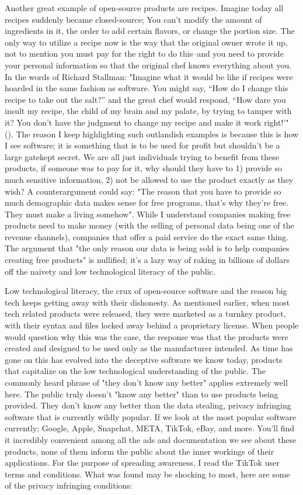 \documentclass[11pt]{article}
\begin{document}
Another great example of open-source products are recipes. Imagine today all recipes suddenly became closed-source; You can't modify the amount of ingredients in it, the order to add certain flavors, or change the portion size. The only way to utilize a recipe now is the way that the original owner wrote it up, not to mention you must pay for the right to do this--and you need to provide your personal information so that the original chef knows everything about you. In the words of Richard Stallman: "Imagine what it would be like if recipes were hoarded in the same fashion as software. You might say, ``How do I change this recipe to take out the salt?'' and the great chef would respond, ``How dare you insult my recipe, the child of my brain and my palate, by trying to tamper with it? You don't have the judgment to change my recipe and make it work right!'" (\cite{whySoftwareShouldBeFree}). The reason I keep highlighting such outlandish examples is because this is how I see software; it is something that is to be used for profit but shouldn't be a large gatekept secret. We are all just individuals trying to benefit from these products, if someone was to pay for it, why should they have to 1) provide so much sensitive information, 2) not be allowed to use the product exactly as they wish? A counterargument could say: "The reason that you have to provide so much demographic data makes sense for free programs, that's why they're free. They must make a living somehow". While I understand companies making free products need to make money (with the selling of personal data being one of the revenue channels), companies that offer a paid service do the exact same thing. The argument that "the only reason our data is being sold is to help companies creating free products" is nullified; it's a lazy way of raking in billions of dollars off the naivety and low technological literacy of the public. 

Low technological literacy, the crux of open-source software and the reason big tech keeps getting away with their dishonesty. As mentioned earlier, when most tech related products were released, they were marketed as a turnkey product, with their syntax and files locked away behind a proprietary license. When people would question why this was the case, the response was that the products were created and designed to be used only as the manufacturer intended. As time has gone on this has evolved into the deceptive software we know today, products that capitalize on the low technological understanding of the public. The commonly heard phrase of "they don't know any better" applies extremely well here. The public truly doesn't "know any better" than to use products being provided. They don't know any better than the data stealing, privacy infringing software that is currently wildly popular. If we look at the most popular software currently: Google, Apple, Snapchat, META, TikTok, eBay, and more. You'll find it incredibly convenient among all the ads and documentation we see about these products, none of them inform the public about the inner workings of their applications. For the purpose of spreading awareness, I read the TikTok user terms and conditions. What was found may be shocking to most, here are some of the privacy infringing conditions:
\end{document}

